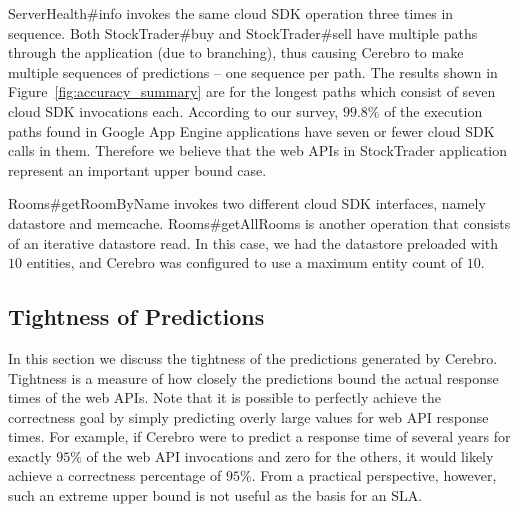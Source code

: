 ServerHealth\#info invokes the same cloud SDK operation three times in
sequence. Both StockTrader\#buy and StockTrader\#sell have multiple paths
through the application 
(due to branching), thus causing Cerebro to make multiple
sequences of predictions -- one sequence per path. The results shown in
Figure~\ref{fig:accuracy_summary} are for the longest paths which consist of
seven cloud SDK invocations each. According to our survey, $99.8\%$ of the
execution paths found in Google App Engine applications have seven or 
fewer cloud SDK
calls in them. Therefore we believe that the web APIs in StockTrader
application represent an important upper bound case. 

Rooms\#getRoomByName
invokes two different cloud SDK interfaces, namely datastore and memcache.
Rooms\#getAllRooms is another operation that consists of an iterative
datastore read. In this case, we had the datastore preloaded with $10$ entities,
and Cerebro was configured to use a maximum entity count of $10$. 

\subsection{Tightness of Predictions}

In this section we discuss the tightness of the predictions generated by Cerebro. 
Tightness is a measure of how closely the predictions
bound the actual response times of the web APIs. 
Note that it is possible to perfectly achieve the correctness goal
by simply predicting overly large values for web API response times. For example, if Cerebro were to
predict a response time of several years for exactly $95\%$ of the web API
invocations and zero for the others, it would likely
achieve a correctness percentage of $95\%$.  From a practical perspective,
however, such an extreme upper bound is not useful as the basis for an SLA. 

